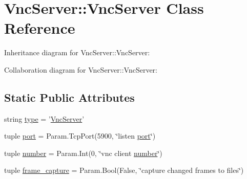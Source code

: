 \hypertarget{classVncServer_1_1VncServer}{
\section{VncServer::VncServer Class Reference}
\label{classVncServer_1_1VncServer}
}


Inheritance diagram for VncServer::VncServer:


Collaboration diagram for VncServer::VncServer:
\subsection*{Static Public Attributes}
\begin{DoxyCompactItemize}
\item 
string \hyperlink{classVncServer_1_1VncServer_a18b1167e6c0414f5bbe76116e29e81c8}{type} = '\hyperlink{classVncServer_1_1VncServer}{VncServer}'
\item 
tuple \hyperlink{classVncServer_1_1VncServer_acd53d0ea3e4e1a0f99372c165be452c5}{port} = Param.TcpPort(5900, \char`\"{}listen \hyperlink{classport}{port}\char`\"{})
\item 
tuple \hyperlink{classVncServer_1_1VncServer_a04d2358b5b6b9071d763987c65ffc42a}{number} = Param.Int(0, \char`\"{}vnc client \hyperlink{classVncServer_1_1VncServer_a04d2358b5b6b9071d763987c65ffc42a}{number}\char`\"{})
\item 
tuple \hyperlink{classVncServer_1_1VncServer_ae12ce7ac563c8d2605be5bb314695293}{frame\_\-capture} = Param.Bool(False, \char`\"{}capture changed frames to files\char`\"{})
\end{DoxyCompactItemize}


